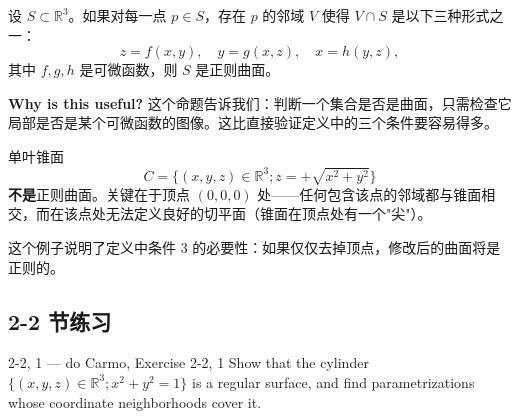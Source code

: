 \begin{Proposition}[垂直投影判断法]\label{prop:graph-criterion}
设 $S \subset \mathbb{R}^3$。如果对每一点 $p \in S$，存在 $p$ 的邻域 $V$ 使得 $V \cap S$ 是以下三种形式之一：
\[
z = f(x,y),\quad y = g(x,z),\quad x = h(y,z),
\]
其中 $f,g,h$ 是可微函数，则 $S$ 是正则曲面。
\end{Proposition}

\textbf{Why is this useful?} 这个命题告诉我们：判断一个集合是否是曲面，只需检查它局部是否是某个可微函数的图像。这比直接验证定义中的三个条件要容易得多。

\begin{Example}[锥面不是正则曲面]\label{ex:cone-not-regular}
单叶锥面
\[
C = \{(x,y,z) \in \mathbb{R}^3; z = +\sqrt{x^2+y^2}\}
\]
\textbf{不是}正则曲面。关键在于顶点 $(0,0,0)$ 处——任何包含该点的邻域都与锥面相交，而在该点处无法定义良好的切平面（锥面在顶点处有一个"尖"）。

这个例子说明了定义中条件 3 的必要性：如果仅仅去掉顶点，修改后的曲面将是正则的。
\end{Example}

\subsection*{2-2 节练习}

\begin{exercise}{2-2, 1 — do Carmo, Exercise 2-2, 1}
Show that the cylinder $\{(x,y,z)\in \mathbb{R}^3;x^2 +y^2 = 1\}$ is a regular surface, and find parametrizations whose coordinate neighborhoods cover it.
\end{exercise}

